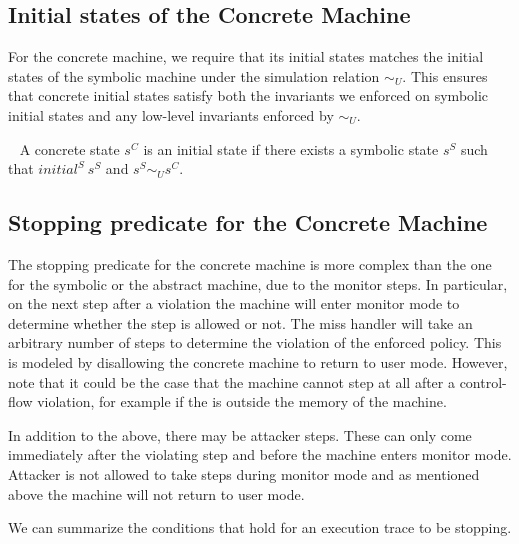 \subsection{Initial states of the Concrete Machine}
\label{sec:concrete_initial}

For the concrete machine, we require that its initial states matches
the initial states of the symbolic machine under the simulation
relation $\sim_U$. This ensures that concrete initial states satisfy
both the invariants we enforced on symbolic initial states and any
low-level invariants enforced by $\sim_U$.

\begin{definition}\label{concrete_initia_pred}
  ~ A concrete state $s^C$ is an initial state if there exists a
  symbolic state $s^S$ such that $initial^S ~ s^S$ and $s^S \sim_U
  s^C$.
\end{definition}

\subsection{Stopping predicate for the Concrete Machine}
\label{sec:concrete_stopping}

The stopping predicate for the concrete machine is more complex than
the one for the symbolic or the abstract machine, due to the monitor
steps. In particular, on the next step after a violation the machine
will enter monitor mode to determine whether the step is allowed or
not. The miss handler will take an arbitrary number of steps to
determine the violation of the enforced policy. This is modeled by
disallowing the concrete machine to return to user mode.  However,
note that it could be the case that the machine cannot step at all
after a control-flow violation, for example if the \pc is outside the
memory of the machine.

In addition to the above, there may be attacker steps. These can only
come immediately after the violating step and before the machine
enters monitor mode. Attacker is not allowed to take steps during
monitor mode and as mentioned above the machine will not return to
user mode.

We can summarize the conditions that hold for an execution trace to
be stopping.

